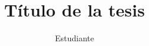 \documentclass[12pt]{uaztesis}
\numberwithin{listing}{chapter}
\begin{document}
\thesisd %

 \hyphenation{}

 \clearpage{}


\title{Título de la tesis} 
\author{Estudiante}

  
 
 

\date{\the\year{}}


 \maketitle

\begin{resumen}
            
\end{resumen}

\begin{dedicatoria}
            
\end{dedicatoria}

\begin{agradecimientos}
          
\end{agradecimientos}

\tableofcontents
\listoffigures                 
\listoftables                  

\begin{nomenclatura}
    
\end{nomenclatura}

\begin{listofsymbols}
    
\end{listofsymbols}
\end{document}
